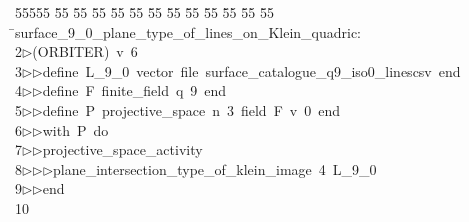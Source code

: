 %
%
\begin{tabbing}
55555 \= 55 \= 55 \= 55 \= 55 \= 55 \= 55 \= 55 \= 55 \= 55 \= 55 \= 55 \= 55 \= \>surface\_9\_0\_plane\_type\_of\_lines\_on\_Klein\_quadric:\\[0pt]
2\>$\triangleright$\>(ORBITER)\ v\ 6\ \\[0pt]
3\>$\triangleright$\>$\triangleright$\>define\ L\_9\_0\ vector\ file\ surface\_catalogue\_q9\_iso0\_linescsv\ end\ \\[0pt]
4\>$\triangleright$\>$\triangleright$\>define\ F\ finite\_field\ q\ 9\ end\ \\[0pt]
5\>$\triangleright$\>$\triangleright$\>define\ P\ projective\_space\ n\ 3\ field\ F\ v\ 0\ end\ \\[0pt]
6\>$\triangleright$\>$\triangleright$\>with\ P\ do\ \\[0pt]
7\>$\triangleright$\>$\triangleright$\>projective\_space\_activity\ \\[0pt]
8\>$\triangleright$\>$\triangleright$\>$\triangleright$\>plane\_intersection\_type\_of\_klein\_image\ 4\ L\_9\_0\ \\[0pt]
9\>$\triangleright$\>$\triangleright$\>end\ \\[0pt]
10\>\end{tabbing}
